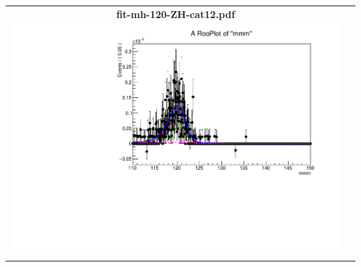\begin{longtable}{|c|c|}
{}
 \\
\hline
\parbox{0.49\textwidth}{
\centering
{\bfseries fit-mh-120-ZH-cat12.pdf}
\includegraphics[width=.49\textwidth]{figures/signal_model/AppendixBdt/ZH/120/fit_mh_120_ZH_cat12.pdf}
}
 & \\ \hline
\end{longtable}

